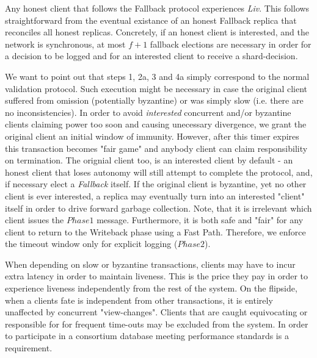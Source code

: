 Any honest client that follows the Fallback protocol experiences \textit{Liv}. This follows straightforward from the eventual existance of an honest Fallback replica that reconciles all honest replicas. Concretely, if an honest client is interested, and the network is synchronous, at most $f+1$ fallback elections are necessary in order for a decision to be logged and for an interested client to receive a shard-decision.


We want to point out that steps 1, 2a, 3 and 4a simply correspond to the normal validation protocol. Such execution might be necessary in case the original client suffered from omission (potentially byzantine) or was simply slow (i.e. there are no inconsistencies). In order to avoid \textit{interested} concurrent and/or byzantine clients claiming power too soon and causing unecessary divergence, we grant the original client an initial window of immunity.
However, after this timer expires this transaction becomes "fair game" and anybody client can claim responsibility on termination. The orignial client too, is an interested client by default - an honest client that loses autonomy will still attempt to complete the protocol, and, if necessary elect a \textit{Fallback} itself. If the original client is byzantine, yet no other client is ever interested, a replica may eventually turn into an interested "client" itself in order to drive forward garbage collection.
Note, that it is irrelevant which client issues the $Phase1$ message. Furthermore, it is both safe and "fair" for any client to return to the Writeback phase using a Fast Path. Therefore, we enforce the timeout window only for explicit logging ($Phase2$). 

When depending on slow or byzantine transactions, clients may have to incur extra latency in order to maintain liveness. 
This is the price they pay in order to experience liveness independently from the rest of the system. On the flipside, when a clients fate is independent from other transactions, it is entirely unaffected by concurrent "view-changes". Clients that are caught equivocating or responsible for for frequent time-outs may be excluded from the system. In order to participate in a consortium database meeting performance standards is a requirement.

